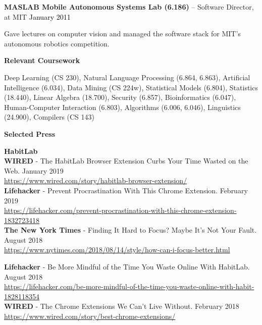 \documentclass[10pt,A4]{article}
\newcommand{\cvsection}[1]
{
	\begin{center}
		\large\textcolor{sectcol}{\textbf{#1}}
	\end{center}
}
\begin{document}
\textbf{MASLAB Mobile Autonomous Systems Lab (6.186)} -- Software Director, at MIT \hfill \textcolor{black}{January 2011}

Gave lectures on computer vision and managed the software stack for MIT's autonomous robotics competition.\\

\cvsection{Relevant Coursework}

Deep Learning (CS 230), Natural Language Processing (6.864, 6.863), Artificial Intelligence (6.034), Data Mining (CS 224w), Statistical Models (6.804), Statistics (18.440), Linear Algebra (18.700), Security (6.857), Bioinformatics (6.047), Human-Computer Interaction (6.803), Algorithms (6.006, 6.046), Linguistics (24.900), Compilers (CS 143)\\

\cvsection{Selected Press}

\textcolor{sectcol}{\textbf{HabitLab}}\\

\textbf{WIRED} - The HabitLab Browser Extension Curbs Your Time Wasted on the Web. \hfill January 2019\\
\url{https://www.wired.com/story/habitlab-browser-extension/}\\

\textbf{Lifehacker} - Prevent Procrastination With This Chrome Extension. \hfill February 2019\\
\url{https://lifehacker.com/prevent-procrastination-with-this-chrome-extension-1832723418}\\

\textbf{The New York Times} - Finding It Hard to Focus? Maybe It’s Not Your Fault. \hfill August 2018\\
\url{https://www.nytimes.com/2018/08/14/style/how-can-i-focus-better.html}\\

\pagebreak

\textbf{Lifehacker} - Be More Mindful of the Time You Waste Online With HabitLab. \hfill August 2018\\
\url{https://lifehacker.com/be-more-mindful-of-the-time-you-waste-online-with-habit-1828118354}\\

\textbf{WIRED} - The Chrome Extensions We Can't Live Without. \hfill February 2018\\
\url{https://www.wired.com/story/best-chrome-extensions/}\\
\end{document}
